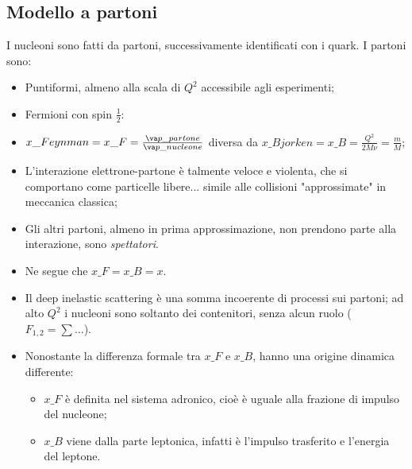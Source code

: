 \subsection{Modello a partoni}
I nucleoni sono fatti da partoni, successivamente identificati con i quark. I partoni sono:
    \begin{itemize}
        \item Puntiformi, almeno alla scala di $Q^2$ accessibile agli esperimenti;
        \item Fermioni con spin $\frac{1}{2}$:
        \item $x\_{Feynman}=x\_F=\frac{\va p\_{partone}}{\va p\_{nucleone}}$ diversa da $x\_{Bjorken}=x\_B=\frac{Q^2}{2M\nu}=\frac{m}{M}$;
        \item L'interazione elettrone-partone è talmente veloce e violenta, che si comportano come particelle libere... simile alle collisioni "approssimate" in meccanica classica;
        \item Gli altri partoni, almeno in prima approssimazione, non prendono parte alla interazione, sono \textit{spettatori}.
        \item Ne segue che $x\_F=x\_B=x$.
        \item Il deep inelastic scattering è una somma incoerente di processi sui partoni; ad alto $Q^2$ i nucleoni sono soltanto dei contenitori, senza alcun ruolo ($F_{1,2}=\sum\dots$).
        \item Nonostante la differenza formale tra $x\_F$ e $x\_B$, hanno una origine dinamica differente:
        \begin{itemize}
            \item $x\_F$ è definita nel sistema adronico, cioè è uguale alla frazione di impulso del nucleone;
            \item $x\_B$ viene dalla parte leptonica, infatti è l'impulso trasferito e l'energia del leptone. 
        \end{itemize}
    \end{itemize} 
